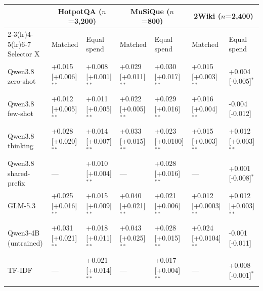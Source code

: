 \begin{tabular}{@{}lllllll@{}}
\toprule
 & \multicolumn{2}{c}{HotpotQA ($n$=3,200)} & \multicolumn{2}{c}{MuSiQue ($n$=800)} & \multicolumn{2}{c}{2Wiki ($n$=2,400)}\\
\cmidrule(lr){2-3}\cmidrule(lr){4-5}\cmidrule(lr){6-7}
Selector X & Matched & Equal spend & Matched & Equal spend & Matched & Equal spend\\
\midrule
Qwen3.8 zero-shot & +0.015 [+0.006]$^{\ast\ast}$ & +0.008 [+0.001]$^{\ast\ast}$ & +0.029 [+0.011]$^{\ast\ast}$ & +0.030 [+0.017]$^{\ast\ast}$ & +0.015 [+0.003]$^{\ast\ast}$ & +0.004 [-0.005]$^{\ast}$\\
Qwen3.8 few-shot & +0.012 [+0.005]$^{\ast\ast}$ & +0.011 [+0.005]$^{\ast\ast}$ & +0.022 [+0.005]$^{\ast\ast}$ & +0.029 [+0.016]$^{\ast\ast}$ & +0.016 [+0.004]$^{\ast\ast}$ & -0.004 [-0.012]\\
Qwen3.8 thinking & +0.028 [+0.020]$^{\ast\ast}$ & +0.014 [+0.007]$^{\ast\ast}$ & +0.033 [+0.015]$^{\ast\ast}$ & +0.023 [+0.0100]$^{\ast\ast}$ & +0.015 [+0.003]$^{\ast\ast}$ & +0.012 [+0.003]$^{\ast\ast}$\\
Qwen3.8 shared-prefix & --- & +0.010 [+0.004]$^{\ast\ast}$ & --- & +0.028 [+0.016]$^{\ast\ast}$ & --- & +0.001 [-0.008]$^{\ast}$\\
GLM-5.3 & +0.025 [+0.016]$^{\ast\ast}$ & +0.015 [+0.009]$^{\ast\ast}$ & +0.040 [+0.021]$^{\ast\ast}$ & +0.021 [+0.006]$^{\ast\ast}$ & +0.012 [+0.0003]$^{\ast\ast}$ & +0.012 [+0.003]$^{\ast\ast}$\\
Qwen3-4B (untrained) & +0.031 [+0.021]$^{\ast\ast}$ & +0.018 [+0.011]$^{\ast\ast}$ & +0.043 [+0.025]$^{\ast\ast}$ & +0.028 [+0.015]$^{\ast\ast}$ & +0.024 [+0.0104]$^{\ast\ast}$ & -0.001 [-0.011]\\
TF-IDF & --- & +0.021 [+0.014]$^{\ast\ast}$ & --- & +0.017 [+0.004]$^{\ast\ast}$ & --- & +0.008 [-0.001]$^{\ast}$\\
\bottomrule
\end{tabular}
